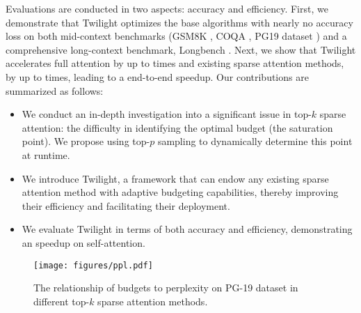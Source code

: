 
Evaluations are conducted in two aspects: accuracy and efficiency. First, we demonstrate that Twilight optimizes the base algorithms with nearly no accuracy loss on both mid-context benchmarks (GSM8K \cite{cobbe2021training}, COQA \cite{reddy-etal-2019-coqa}, PG19 dataset \cite{rae2019compressive}) and a comprehensive long-context benchmark, Longbench \cite{bai2024longbench}. Next, we show that Twilight accelerates full attention by up to \jiaming{$15.4\times$} times and existing sparse attention methods, by up to \jiaming{$2.2\times$} times, leading to a \jiaming{$3.9\times$} end-to-end speedup. Our contributions are summarized as follows:
\begin{itemize}
\item We conduct an in-depth investigation into a significant issue in top-$k$ sparse attention: the difficulty in identifying the optimal budget (the saturation point). We propose using top-$p$ sampling to dynamically determine this point at runtime.
\item We introduce Twilight, a framework that can endow any existing sparse attention method with adaptive budgeting capabilities, thereby improving their efficiency and facilitating their deployment.
\item We evaluate Twilight in terms of both accuracy and efficiency, demonstrating an \jiaming{$15.4\times$} speedup on self-attention.
\end{itemize}

\begin{figure}[t]
\begin{center}
\centerline{\texttt{[image: figures/ppl.pdf]}}
\caption{The relationship of budgets to perplexity on PG-19 dataset in different top-$k$ sparse attention methods.
}
\label{fig:ppl}
\end{center}
\vskip -0.3in
\end{figure}